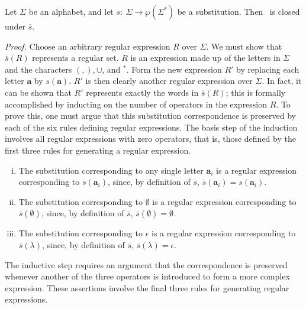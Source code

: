\begin{thm}\label{thm-6.6}
Let $\Sigma$ be an alphabet, and let $s:\ \Sigma \rightarrow \wp(\Sigma^*)$ be a
substitution. Then \RSIG\ is closed under $\overline{s}$.

\emph{Proof.} Choose an arbitrary regular expression $R$ over $\Sigma$. We must
show that $\overline{s}(R)$ represents a regular set. $R$ is an expression made
up of the letters in $\Sigma$ and the characters $(,),\cup$, and $^*$. Form the
new expression $R'$ by replacing each letter $\pmb{a}$ by $s(\pmb{a})$. $R'$ is
then clearly another regular expression over $\Sigma$. In fact, it can be shown
that $R'$ represents exactly the words in $\overline{s}(R)$; this is formally
accomplished by inducting on the number of operators in the expression $R$. To
prove this, one must argue that this substitution correspondence is preserved by
each of the six rules defining regular expressions. The basis step of the
induction involves all regular expressions with zero operators, that is, those
defined by the first three rules for generating a regular expression.
\begin{enumerate}[i.]
\item The substitution corresponding to any single letter $\pmb{a}_i$ is a
regular expression corresponding to $\overline{s}(\pmb{a}_i)$, since, by
definition of $\overline{s}$, $\overline{s}(\pmb{a}_i) = s(\pmb{a}_i)$.
\item The substitution corresponding to $\emptyset$ is a regular expression
corresponding to $\overline{s}(\emptyset)$, since, by definition of
$\overline{s}$, $\overline{s}(\emptyset) = \emptyset$.
\item The substitution corresponding to $\epsilon$ is a regular expression
corresponding to $\overline{s}(\lambda)$, since, by definition of $\overline{s}$,
$\overline{s}(\lambda) = \epsilon$.
\end{enumerate}
The inductive step requires an argument that the correspondence is preserved
whenever another of the three operators is introduced to form a more complex
expression. These assertions involve the final three rules for generating
regular expressions.
\end{thm}
